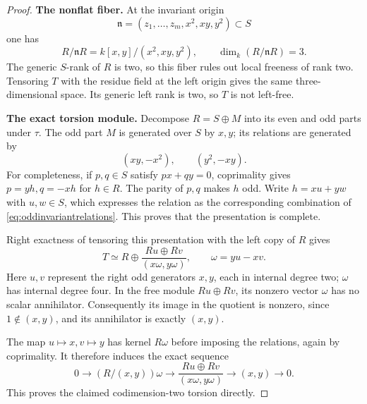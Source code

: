 \documentclass[11pt,a4paper]{article}
\theoremstyle{named}\newtheorem{finding}{Finding}[section]
\theoremstyle{definition}\newtheorem{definition}[finding]{Definition}
\theoremstyle{remark}\newtheorem{remark}[finding]{Remark}
\begin{document}
\begin{proof}
\par\smallskip\noindent\textbf{The nonflat fiber.}\quad
At the invariant origin
\[
 \mathfrak n=(z_1,\ldots,z_m,x^2,xy,y^2)\subset S
\]
one has
\begin{equation}\label{eq:invariantoriginfiber}
 R/\mathfrak nR
       =k[x,y]/(x^2,xy,y^2),
 \qquad \dim_k(R/\mathfrak nR)=3.
\end{equation}
The generic \(S\)-rank of \(R\) is two, so this fiber rules out
local freeness of rank two. Tensoring \(T\) with the residue
field at the left origin gives the same three-dimensional
space. Its generic left rank is two, so \(T\) is not left-free.

\par\smallskip\noindent\textbf{The exact torsion module.}\quad
Decompose \(R=S\oplus M\) into its even and odd parts under
\(\tau\). The odd part \(M\) is generated over \(S\) by \(x,y\);
its relations are generated by
\begin{equation}\label{eq:oddinvariantrelations}
                 (xy,-x^2),\qquad(y^2,-xy).
\end{equation}
For completeness, if \(p,q\in S\) satisfy \(px+qy=0\),
coprimality gives \(p=yh,q=-xh\) for \(h\in R\).
The parity of \(p,q\) makes \(h\) odd. Write
\(h=xu+yw\) with \(u,w\in S\), which expresses the relation
as the corresponding combination of
\eqref{eq:oddinvariantrelations}. This proves that the
presentation is complete.

Right exactness of tensoring this presentation with the left
copy of \(R\) gives
\begin{equation}\label{eq:invarianttorsionpresentation}
 T\simeq R\oplus
       \frac{Ru\oplus Rv}{(x\omega,y\omega)},
 \qquad \omega=yu-xv.
\end{equation}
Here \(u,v\) represent the right odd generators \(x,y\), each
in internal degree two; \(\omega\) has internal degree four.
In the free module \(Ru\oplus Rv\), its nonzero vector
\(\omega\) has no scalar annihilator. Consequently its image
in the quotient is nonzero, since \(1\notin(x,y)\), and its
annihilator is exactly \((x,y)\).

The map \(u\mapsto x,v\mapsto y\) has kernel \(R\omega\)
before imposing the relations, again by coprimality.
It therefore induces the exact sequence
\begin{equation}\label{eq:invarianttorsionsequence}
 0\longrightarrow (R/(x,y))\omega
 \longrightarrow \frac{Ru\oplus Rv}{(x\omega,y\omega)}
 \longrightarrow (x,y)\longrightarrow0.
\end{equation}
This proves the claimed codimension-two torsion directly.


\end{proof}
\end{document}
